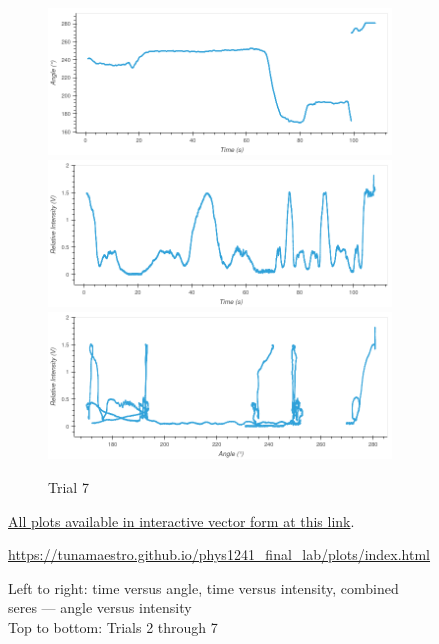 \begin{figure}
\begin{subfigure}{1.0\textwidth}
\caption{Trial 7}
\includegraphics[width=\plotwidth]{plots/t8-time-angle.png}
\includegraphics[width=\plotwidth]{plots/t8-time-intensity.png}
\includegraphics[width=\plotwidth]{plots/t8-angle-intensity.png}
\end{subfigure}

\caption*{
Left to right: time versus angle, time versus intensity, combined seres — angle versus intensity\\
Top to bottom: Trials 2 through 7
}
\href{https://tunamaestro.github.io/phys1241_final_lab/plots/index.html}{All plots available in interactive vector form at this link}.

\url{https://tunamaestro.github.io/phys1241_final_lab/plots/index.html}

\end{figure}
